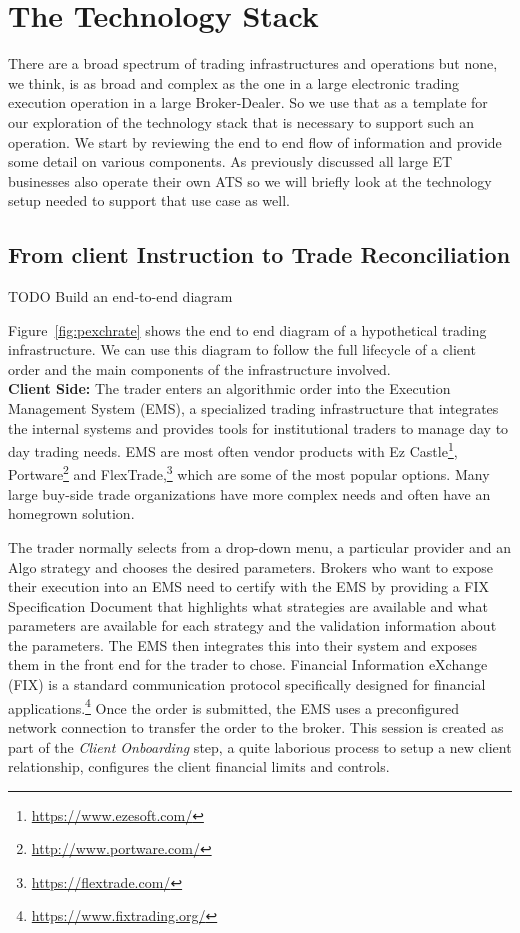 \chapter{The Technology Stack\label{chap:ch_tech}}

There are a broad spectrum of trading infrastructures and operations but none, we think, is as broad and complex as the one in a large electronic trading execution operation in a large Broker-Dealer. So we use that as a template for our exploration of the technology stack that is necessary to support such an operation. We start by reviewing the end to end flow of information and provide some detail on various components. As previously discussed all large ET businesses also operate their own ATS so we will briefly look at the technology setup needed to support that use case as well.


\section{From client Instruction to Trade Reconciliation}

TODO Build an end-to-end diagram


Figure~\ref{fig:pexchrate} shows the end to end diagram of a hypothetical trading infrastructure. We can use this diagram to follow the full lifecycle of a client order and the main components of the infrastructure involved. \\


\noindent\textbf{Client Side:} The trader enters an algorithmic order into the Execution Management System (EMS), a specialized trading infrastructure that integrates the internal systems and provides tools for institutional traders to manage day to day trading needs. EMS are most often vendor products with Ez Castle\footnote{\url{https://www.ezesoft.com/}}, Portware\footnote{\url{http://www.portware.com/}} and FlexTrade,\footnote{\url{https://flextrade.com/}} which are some of the most popular options. Many large buy-side trade organizations have more complex needs and often have an homegrown solution.


The trader normally selects from a drop-down menu, a particular provider and an Algo strategy and  chooses the desired parameters. Brokers who want to expose their execution into an EMS need to certify with the EMS by providing a FIX Specification Document that highlights what strategies are available and what parameters are available for each strategy and the validation information about the parameters. The EMS then integrates this into their system and exposes them in the front end for the trader to chose. Financial Information eXchange (FIX) is a standard communication protocol specifically designed for financial applications.\footnote{\url{https://www.fixtrading.org/}} Once the order is submitted, the EMS uses a preconfigured network connection to transfer the order to the broker. This session is created as part of the \emph{Client Onboarding} step, a quite laborious process to setup a new client relationship, configures the client financial limits and controls. \\


